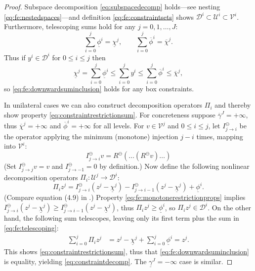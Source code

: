 \documentclass[letterpaper,final,12pt,reqno]{amsart}
\theoremstyle{cstyle}
\theoremstyle{cstyle*}
\theoremstyle{dstyle}
\numberwithin{equation}{section}
\numberwithin{figure}{section}
\numberwithin{table}{section}
\numberwithin{theorem}{section}
\newcommand{\cV}{\mathcal{V}}
\newcommand{\minR}{R^{\bm{\ominus}}}
\begin{document}
\begin{proof}  Subspace decomposition \eqref{eq:subspacedecomp} holds---see nesting \eqref{eq:fe:nestedspaces}---and definition \eqref{eq:fe:constraintsets} shows $\mathcal{D}^i \subset \mathcal{U}^i \subset \cV^i$.  Furthermore, telescoping sums hold for any $j=0,1,\dots,J$:
\begin{equation}
\sum_{i=0}^j \underline{\phi}^i = \underline{\chi}^j, \qquad \sum_{i=0}^j \overline{\phi}^i = \overline{\chi}^j.  \label{eq:fe:telescoping}
\end{equation}
Thus if $y^i \in \mathcal{D}^i$ for $0 \le i \le j$ then
\begin{equation}
\underline{\chi}^j = \sum_{i=0}^j \underline{\phi}^i \le \sum_{i=0}^j y^i \le \sum_{i=0}^j \overline{\phi}^i \le \overline{\chi}^j, \label{eq:fe:lemmaordering}
\end{equation}
so \eqref{eq:fe:downwardsuminclusion} holds for any box constraints.

In unilateral cases we can also construct decomposition operators $\Pi_i$ and thereby show property \eqref{eq:constraintrestrictionsum}.  For concreteness suppose $\overline{\gamma}^J=+\infty$, thus $\overline{\chi}^j=+\infty$ and $\overline{\phi}^i = +\infty$ for all levels.  For $v\in \mathcal{V}^j$ and $0\le i \le j$, let $I_{j\to i}^\ominus$ be the operator applying the minimum (monotone) injection $j-i$ times, mapping into $\mathcal{V}^i$:
\begin{equation}
I_{j\to i}^\ominus v = \minR(\dots(\minR v)\dots)  \label{eq:fe:minimummaps}
\end{equation}
(Set $I_{j\to j}^\ominus v = v$ and $I_{j\to -1}^\ominus=0$ by definition.)  Now define the following nonlinear decomposition operators $\Pi_i:\mathcal{U}^j \to \mathcal{D}^i$:
\begin{equation}
\Pi_i z^j = I_{j\to i}^\ominus(z^j - \underline{\chi}^j) - I_{j\to i-1}^\ominus(z^j - \underline{\chi}^j) + \underline{\phi}^i.  \label{eq:fe:unilateraldecompositionoperator}
\end{equation}
(Compare equation (4.9) in \cite{GraeserKornhuber2009}.)  Property \eqref{eq:fe:monotonerestrictionprops} implies $I_{j\to i}^\ominus(z^j - \underline{\chi}^j) \ge I_{j\to i-1}^\ominus(z^j - \underline{\chi}^j)$, thus $\Pi_i z^j \ge \underline{\phi}^i$, so $\Pi_i z^j \in \mathcal{D}^i$.  On the other hand, the following sum telescopes, leaving only its first term plus the sum in \eqref{eq:fe:telescoping}:
\begin{align*}
\sum_{i=0}^j \Pi_i z^j &= z^j - \underline{\chi}^j + \sum_{i=0}^j \underline{\phi}^i = z^j.
\end{align*}
This shows \eqref{eq:constraintrestrictionsum}, thus that \eqref{eq:fe:downwardsuminclusion} is equality, yielding \eqref{eq:constraintdecomp}.  The $\underline{\gamma}^J=-\infty$ case is similar.
\end{proof}
\end{document}

